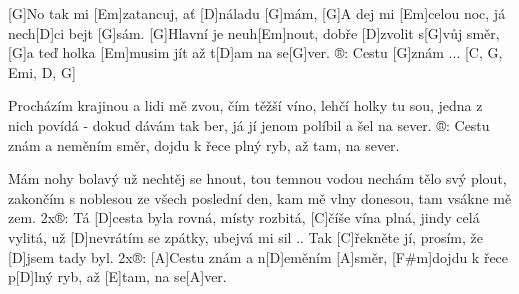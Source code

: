 
[G]No tak mi [Em]zatancuj, ať [D]náladu [G]mám,
[G]A dej mi [Em]celou noc, já nech[D]ci bejt [G]sám.
[G]Hlavní je neuh[Em]nout, dobře [D]zvolit s[G]vůj směr, 
[G]a teď holka [Em]musim jít až t[D]am na se[G]ver.
®: Cestu [G]znám ... [C, G, Emi, D, G]

Procházím krajinou a lidi mě zvou,
čím těžší víno, lehčí holky tu sou,
jedna z nich povídá - dokud dávám tak ber,
já jí jenom políbil a šel na sever.
®: Cestu znám a neměním směr, 
dojdu k řece plný ryb, až tam, na sever.

Mám nohy bolavý už nechtěj se hnout,
tou temnou vodou nechám tělo svý plout,
zakončím s noblesou ze všech poslední den,
kam mě vlny donesou, tam vsákne mě zem.
2x®:
Tá [D]cesta byla rovná, místy rozbitá,
[C]\null číše vína plná, jindy celá vylitá,
už [D]nevrátím se zpátky, ubejvá mi sil ..
Tak [C]\null řekněte jí, prosím, že [D]jsem tady byl.
2x®:
[A]Cestu znám a n[D]eměním [A]směr, 
[F#m]dojdu k řece p[D]lný ryb, až [E]tam, na se[A]ver.